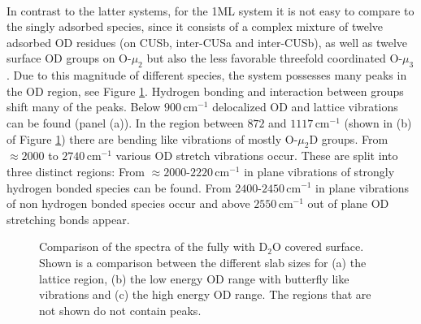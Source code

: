 \documentclass[11pt,DIV=13,BCOR=5mm,a4paper,headinclude]{scrbook}
\begin{document}
\\
In contrast to the latter systems, for the 1ML system it is not easy to compare to the singly adsorbed species, since it consists of a complex mixture of twelve adsorbed OD residues (on CUSb, inter-CUSa and inter-CUSb), as well as twelve surface OD groups on O-$\mu_2$ but also the less favorable threefold coordinated O-$\mu_3$.
Due to this magnitude of different species, the system possesses many peaks in the OD region, see Figure \ref{abb:fullyhydrox_spec}.
Hydrogen bonding and interaction between groups shift many of the peaks.
Below $900\,$cm$^{-1}$ delocalized OD and lattice vibrations can be found (panel (a)).
In the region between $872$ and $1117\,$cm$^{-1}$ (shown in (b) of Figure \ref{abb:fullyhydrox_spec}) there are bending like vibrations of mostly O-$\mu_2$D groups.
From $\approx2000$ to $2740\,$cm$^{-1}$ various OD stretch vibrations occur.
These are split into three distinct regions: From $\approx 2000$-$2220\,$cm$^{-1}$ in plane vibrations of strongly hydrogen bonded species can be found.
From $2400$-$2450\,$cm$^{-1}$ in plane vibrations of non hydrogen bonded species occur and above $2550\,$cm$^{-1}$ out of plane OD stretching bonds appear.
 \begin{figure} [!h]
 \centering
              \quad
              \quad
 \caption{Comparison of the spectra of the fully with D$_2$O covered surface.
Shown is a comparison between the different slab sizes for (a) the lattice region, (b) the low energy OD range with butterfly like vibrations and (c) the high energy OD range.
The regions that are not shown do not contain peaks.} 
        \label{abb:fullyhydrox_spec}
 \end{figure}
\end{document}
